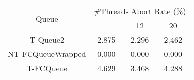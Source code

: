 \begin{tabular}{|c|c|c|c|}
\hline
\multirow{2}{*}{Queue} & \multicolumn{3}{c|}{\#Threads Abort Rate (\%)}\\\cline{2-4}& \quad 4 & 12 & 20\\
\hline
\hline
T-Queue2 & 2.875 & 2.296 & 2.462\\
NT-FCQueueWrapped & 0.000 & 0.000 & 0.000\\
T-FCQueue & 4.629 & 3.468 & 4.288\\
\hline\end{tabular}
